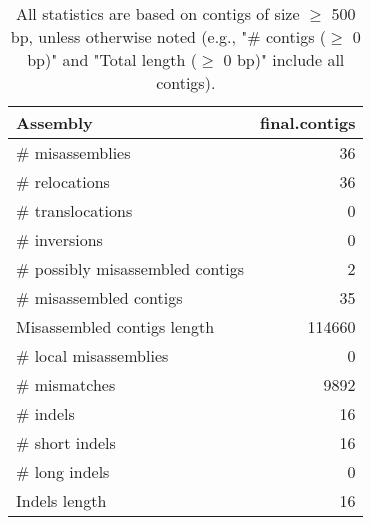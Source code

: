 \documentclass[12pt,a4paper]{article}
\begin{document}
\begin{table}[ht]
\begin{center}
\caption{All statistics are based on contigs of size $\geq$ 500 bp, unless otherwise noted (e.g., "\# contigs ($\geq$ 0 bp)" and "Total length ($\geq$ 0 bp)" include all contigs).}
\begin{tabular}{|l*{1}{|r}|}
\hline
Assembly & final.contigs \\ \hline
\# misassemblies & 36 \\ \hline
\hspace{5mm}\# relocations & 36 \\ \hline
\hspace{5mm}\# translocations & 0 \\ \hline
\hspace{5mm}\# inversions & 0 \\ \hline
\# possibly misassembled contigs & 2 \\ \hline
\# misassembled contigs & 35 \\ \hline
Misassembled contigs length & 114660 \\ \hline
\# local misassemblies & 0 \\ \hline
\# mismatches & 9892 \\ \hline
\# indels & 16 \\ \hline
\hspace{5mm}\# short indels & 16 \\ \hline
\hspace{5mm}\# long indels & 0 \\ \hline
Indels length & 16 \\ \hline
\end{tabular}
\end{center}
\end{table}
\end{document}
